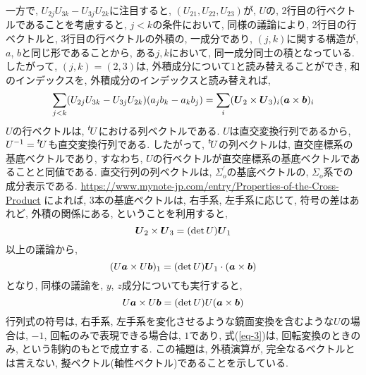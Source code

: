 \documentclass{jsarticle}
\newcommand*{\mbold}[1]{\mbox{\boldmath $#1$}}
\newcommand*{\transp}[1]{\prescript{t\!}{}{#1}}
\begin{document}
一方で, $U_{2j}U_{3k} - U_{3j}U_{2k}$に注目すると, $(U_{21}, U_{22}, U_{23})$が, $U$の, 2行目の行ベクトルであることを考慮すると, $j < k$の条件において, 同様の議論により, 2行目の行ベクトルと, 3行目の行ベクトルの外積の, 一成分であり, $(j, k)$に関する構造が, $a$, $b$と同じ形であることから, ある$j, k$において, 同一成分同士の積となっている. 
したがって, $(j, k) = (2, 3)$は, 外積成分について$1$と読み替えることができ, 和のインデックスを, 外積成分のインデックスと読み替えれば, 
\begin{equation}
  \sum_{j < k}(U_{2j}U_{3k} - U_{3j}U_{2k})(a_j b_k - a_k b_j)
  = \sum_{i} (\mbold{U}_2 \times \mbold{U}_3)_i (\mbold{a} \times \mbold{b})_i
\end{equation}
$U$の行ベクトルは, $\transp{U}$における列ベクトルである. 
$U$は直交変換行列であるから, $U^{-1} = \transp{U}$も直交変換行列である. 
したがって, $\transp{U}$の列ベクトルは, 直交座標系の基底ベクトルであり, すなわち, $U$の行ベクトルが直交座標系の基底ベクトルであることと同値である. 
直交行列の列ベクトルは, $\Sigma_o^\prime$の基底ベクトルの, $\Sigma_o$系での成分表示である.  
\url{https://www.mynote-jp.com/entry/Properties-of-the-Cross-Product} 
によれば, 3本の基底ベクトルは, 右手系, 左手系に応じて, 符号の差はあれど, 外積の関係にある, ということを利用すると, 
\[
  \mbold{U}_2 \times \mbold{U}_3 = (\det U) \mbold{U}_1
\]
以上の議論から, 
\begin{equation}
  (U\mbold{a} \times U\mbold{b})_1 = (\det U)\mbold{U}_1 \cdot (\mbold{a} \times \mbold{b})
\end{equation}
となり, 同様の議論を, $y$, $z$成分についても実行すると,
\begin{equation}
  U\mbold{a} \times U\mbold{b} = (\det U) U (\mbold{a} \times \mbold{b})
\end{equation}
行列式の符号は, 右手系, 左手系を変化させるような鏡面変換を含むような$U$の場合は, $-1$, 回転のみで表現できる場合は, $1$であり, 式(\ref{eq-3})は, 回転変換のときのみ, という制約のもとで成立する. 
この補題は, 外積演算が, 完全なるベクトルとは言えない, 擬ベクトル(軸性ベクトル)であることを示している. 
\end{document}
